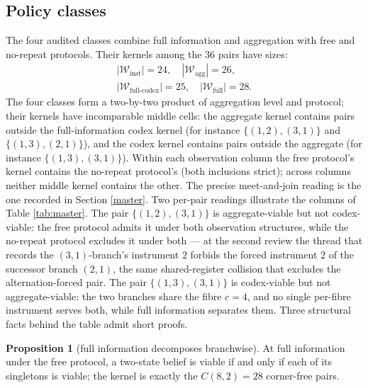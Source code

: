 \documentclass[10pt,twocolumn]{article}
\theoremstyle{definition}
\newtheorem{proposition}{Proposition}
\begin{document}
\subsection{Policy classes}\label{classes}

The four audited classes combine full information and aggregation with
free and no-repeat protocols. Their kernels among the 36 pairs have
sizes:
\begin{gather*}
|\mathcal{W}_{\mathrm{inst}}| = 24,\quad
|\mathcal{W}_{\mathrm{agg}}| = 26,\\
|\mathcal{W}_{\mathrm{full\text{-}codex}}| = 25,\quad
|\mathcal{W}_{\mathrm{full}}| = 28 .
\end{gather*}
The four classes form a two-by-two product of aggregation level and
protocol; their kernels have incomparable middle cells:
the aggregate kernel contains pairs outside the full-information codex
kernel (for instance \(\{(1,2),(3,1)\}\) and \(\{(1,3),(2,1)\}\)), and
the codex kernel contains pairs outside the aggregate (for instance
\(\{(1,3),(3,1)\}\)). Within each observation column the free protocol's
kernel contains the no-repeat protocol's (both inclusions strict); across
columns neither middle kernel contains the other. The precise
meet-and-join reading is the one recorded in Section \ref{master}. Two
per-pair readings illustrate the columns of Table \ref{tab:master}. The
pair \(\{(1,2),(3,1)\}\) is aggregate-viable but not codex-viable: the
free protocol admits it under both observation structures, while the
no-repeat protocol excludes it under both --- at the second review the
thread that records the \((3,1)\)-branch's instrument \(2\) forbids the
forced instrument \(2\) of the successor branch \((2,1)\), the same
shared-register collision that excludes the alternation-forced pair. The pair \(\{(1,3),(3,1)\}\) is
codex-viable but not aggregate-viable: the two branches share the fibre
\(c = 4\), and no single per-fibre instrument serves both, while
full information separates them. Three structural facts behind the table
admit short proofs.

\begin{proposition}[full information decomposes branchwise]\label{prop:decomp}
At full information under the free protocol, a two-state belief is
viable if and only if each of its singletons is viable; the kernel is
exactly the \(C(8,2) = 28\) corner-free pairs.
\end{proposition}
\end{document}
